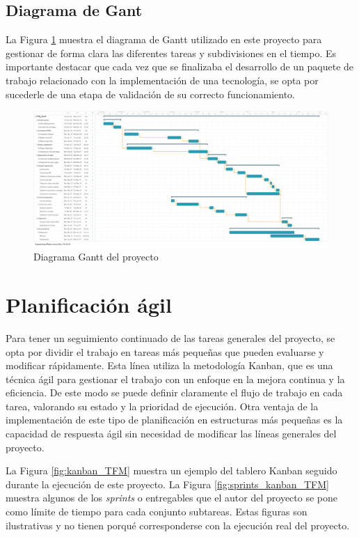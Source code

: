 \newpage
\begin{landscape}
    \subsection{Diagrama de Gant}
    La Figura \ref{fig:gantt} muestra el diagrama de Gantt utilizado en este proyecto para gestionar de forma clara las diferentes tareas y subdivisiones en el tiempo. Es importante destacar que cada vez que se finalizaba el desarrollo de un paquete de trabajo relacionado con la implementación de una tecnología, se opta por sucederle de una etapa de validación de su correcto funcionamiento.
        \begin{figure}[h!]
            \centering
            \includegraphics[width=\linewidth]{figuras/gantt_horizontal.png}
            \caption{Diagrama Gantt del proyecto}
            \label{fig:gantt}
        \end{figure}
\end{landscape}
\restoregeometry
\newpage

\section{Planificación ágil}
Para tener un seguimiento continuado de las tareas generales del proyecto, se opta por dividir el trabajo en tareas más pequeñas que pueden evaluarse y modificar rápidamente. Esta línea utiliza la metodología Kanban, que es una técnica ágil para gestionar el trabajo con un enfoque en la mejora continua y la eficiencia.  De este modo se puede definir claramente el flujo de trabajo en cada tarea, valorando su estado y la prioridad de ejecución. Otra ventaja de la implementación de este tipo de planificación en estructuras más pequeñas es la capacidad de respuesta ágil sin necesidad de modificar las líneas generales del proyecto.

La Figura \ref{fig:kanban_TFM} muestra un ejemplo del tablero Kanban seguido durante la ejecución de este proyecto. La Figura \ref{fig:sprints_kanban_TFM} muestra algunos de los \textit{sprints} o entregables que el autor del proyecto se pone como límite de tiempo para cada conjunto subtareas. Estas figuras son ilustrativas y no tienen porqué corresponderse con la ejecución real del proyecto.

